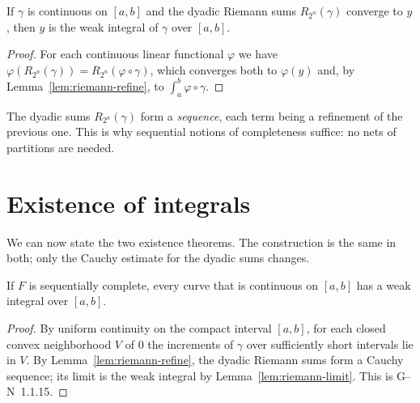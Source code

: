 \begin{lemma}
  \label{lem:riemann-limit}
  \leanok
  If $\gamma$ is continuous on $[a, b]$ and the dyadic Riemann sums $R_{2^n}(\gamma)$ converge to
  $y$, then $y$ is the weak integral of $\gamma$ over $[a, b]$.
\end{lemma}

\begin{proof}
  \leanok
  For each continuous linear functional $\varphi$ we have
  $\varphi(R_{2^n}(\gamma)) = R_{2^n}(\varphi \circ \gamma)$, which converges both to
  $\varphi(y)$ and, by Lemma~\ref{lem:riemann-refine}, to $\int_a^b \varphi \circ \gamma$.
\end{proof}

\begin{remark}
  The dyadic sums $R_{2^n}(\gamma)$ form a \emph{sequence}, each term being a refinement of the
  previous one. This is why sequential notions of completeness suffice: no nets of partitions
  are needed.
\end{remark}

\section{Existence of integrals}
\label{sec:existence}

We can now state the two existence theorems. The construction is the same in both; only the
Cauchy estimate for the dyadic sums changes.

\begin{theorem}
  \label{thm:exists-seq}
  \leanok
  If $F$ is sequentially complete, every curve that is continuous on $[a, b]$ has a weak
  integral over $[a, b]$.
\end{theorem}

\begin{proof}
  \leanok
  By uniform continuity on the compact interval $[a, b]$, for each closed convex neighborhood
  $V$ of $0$ the increments of $\gamma$ over sufficiently short intervals lie in $V$. By
  Lemma~\ref{lem:riemann-refine}, the dyadic Riemann sums form a Cauchy sequence; its limit is
  the weak integral by Lemma~\ref{lem:riemann-limit}. This is G--N~1.1.15.
\end{proof}

